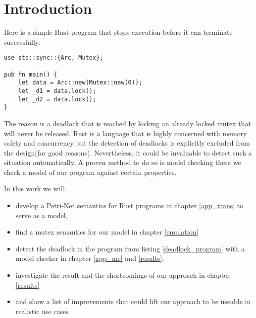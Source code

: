 \chapter{Introduction}
\label{introduction}

Here is a simple Rust\cite{klabnik2018rust} program that stops execution before it can terminate successfully:

\begin{lstlisting}
use std::sync::{Arc, Mutex};

pub fn main() {
    let data = Arc::new(Mutex::new(0));
    let _d1 = data.lock();
    let _d2 = data.lock();
}
\end{lstlisting}
The reason is a deadlock that is reached by locking an already locked mutex that will never be released.
Rust is a language that is highly concerned with memory safety and concurrency\cite{Matsakis:2014:RL:2692956.2663188} but the detection of deadlocks is explicitly excluded from the design\cite[Chapter 8.1]{nomicon}(for good reasons).
Nevertheless, it could be invaluable to detect such a situation automatically.
A proven method to do so is model checking\cite{baier2008principles} there we check a model of our program against certain properties.

In this work we will:
\begin{itemize}
    \item develop a Petri-Net\cite{petri1962kommunikation} semantics for Rust programs in chapter \ref{app_trans} to serve as a model,
    \item find a mutex semantics for our model in chapter \ref{emulation}
    \item detect the deadlock in the program from listing \ref{deadlock_program} with a model checker in chapter \ref{app_mc} and \ref{results},
    \item investigate the result and the shortcomings of our approach in chapter \ref{results}
    \item and show a list of improvements that could lift our approach to be useable in realistic use cases
\end{itemize}